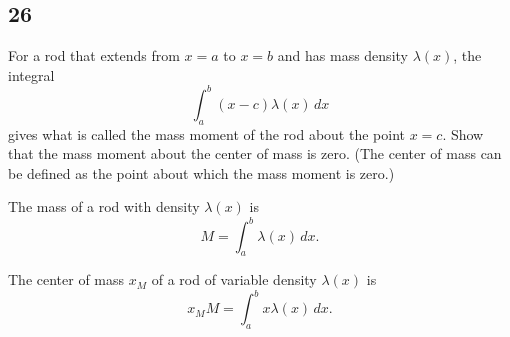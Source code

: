 \documentclass[../hw7.tex]{subfiles}
\begin{document}
\subsection*{26}
For a rod that extends from $x=a$ to $x=b$ and has mass density $\lambda(x)$, the integral 
\[\int_{a}^{b} (x-c)\lambda(x)\,dx\] 
gives what is called the mass moment of the rod about the point $x=c$. 
Show that the mass moment about the center of mass is zero. 
(The center of mass can be defined as the point about which the mass moment is zero.)

\begin{definition}[5.9.4]
    The mass of a rod with density $\lambda(x)$ is \[M=\int_{a}^{b} \lambda(x)\,dx.\]
\end{definition}

\begin{definition}[5.9.5]
    The center of mass $x_M$ of a rod of variable density $\lambda(x)$ is \[x_M M=\int_{a}^{b} x\lambda(x)\,dx.\]
\end{definition}
\end{document}
